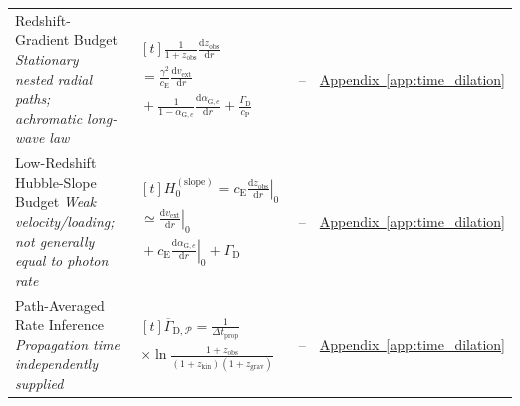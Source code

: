 \begin{longtable}{@{} p{4.5cm} p{6cm} c p{4cm} @{}}
{\raggedright Redshift-Gradient Budget \newline \textit{Stationary nested radial paths; achromatic long-wave law}\par} & {\raggedright $\begin{gathered}[t]\frac1{1+z_{\mathrm{obs}}}\frac{\mathrm dz_{\mathrm{obs}}}{\mathrm dr} \\ =\frac{\gamma^2}{c_{\mathrm E}}\frac{\mathrm dv_{\mathrm{ext}}}{\mathrm dr} \\ {}+\frac{1}{1-\alpha_{\mathrm G,e}}\frac{\mathrm d\alpha_{\mathrm G,e}}{\mathrm dr}+\frac{\Gamma_{\mathrm D}}{c_{\mathrm P}}\end{gathered}$\par} & -- & {\raggedright \hyperref[app:time_dilation]{Appendix~\ref*{app:time_dilation}}\par} \\

{\raggedright Low-Redshift Hubble-Slope Budget \newline \textit{Weak velocity/loading; not generally equal to photon rate}\par} & {\raggedright $\begin{gathered}[t]H_0^{(\mathrm{slope})}=c_{\mathrm E}\left.\frac{\mathrm dz_{\mathrm{obs}}}{\mathrm dr}\right|_0 \\ \simeq\left.\frac{\mathrm dv_{\mathrm{ext}}}{\mathrm dr}\right|_0 \\ {}+c_{\mathrm E}\left.\frac{\mathrm d\alpha_{\mathrm G,e}}{\mathrm dr}\right|_0+\Gamma_{\mathrm D}\end{gathered}$\par} & -- & {\raggedright \hyperref[app:time_dilation]{Appendix~\ref*{app:time_dilation}}\par} \\

{\raggedright Path-Averaged Rate Inference \newline \textit{Propagation time independently supplied}\par} & {\raggedright $\begin{gathered}[t]\overline\Gamma_{\mathrm D,\mathcal P}=\frac1{\Delta t_{\mathrm{prop}}} \\ \times\ln\!\frac{1+z_{\mathrm{obs}}}{(1+z_{\mathrm{kin}})(1+z_{\mathrm{grav}})}\end{gathered}$\par} & -- & {\raggedright \hyperref[app:time_dilation]{Appendix~\ref*{app:time_dilation}}\par} \\


\end{longtable}
